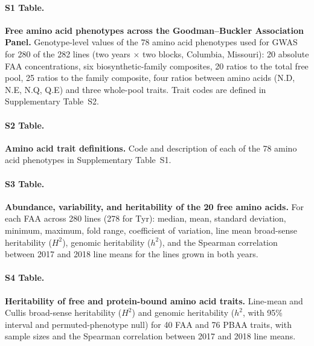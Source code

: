 \clearpage


\clearpage
\newpage

\paragraph*{S1 Table.}
\makeatletter
\def\@currentlabelname{S1 Table}
\makeatother
\label{S1_Table}
\textbf{Free amino acid phenotypes across the Goodman--Buckler Association Panel.} Genotype-level values of the 78 amino acid phenotypes used for GWAS for 280 of the 282 lines (two years $\times$ two blocks, Columbia, Missouri): 20 absolute FAA concentrations, six biosynthetic-family composites, 20 ratios to the total free pool, 25 ratios to the family composite, four ratios between amino acids (N.D, N.E, N.Q, Q.E) and three whole-pool traits. Trait codes are defined in Supplementary Table~S2.

\paragraph*{S2 Table.}
\makeatletter
\def\@currentlabelname{S2 Table}
\makeatother
\label{S2_Table}
\textbf{Amino acid trait definitions.} Code and description of each of the 78 amino acid phenotypes in Supplementary Table~S1.

\paragraph*{S3 Table.}
\makeatletter
\def\@currentlabelname{S3 Table}
\makeatother
\label{S3_Table}
\textbf{Abundance, variability, and heritability of the 20 free amino acids.} For each FAA across 280 lines (278 for Tyr): median, mean, standard deviation, minimum, maximum, fold range, coefficient of variation, line mean broad-sense heritability ($H^2$), genomic heritability ($h^2$), and the Spearman correlation between 2017 and 2018 line means for the lines grown in both years.

\paragraph*{S4 Table.}
\makeatletter
\def\@currentlabelname{S4 Table}
\makeatother
\label{S4_Table}
\textbf{Heritability of free and protein-bound amino acid traits.} Line-mean and Cullis broad-sense heritability ($H^2$) and genomic heritability ($h^2$, with 95\% interval and permuted-phenotype null) for 40 FAA and 76 PBAA traits, with sample sizes and the Spearman correlation between 2017 and 2018 line means.

